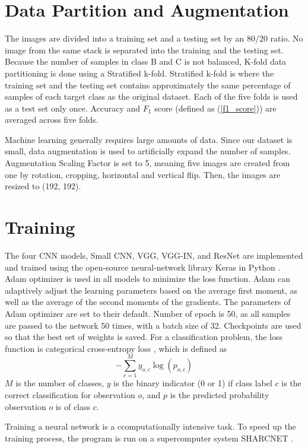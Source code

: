 \section{Data Partition and Augmentation}
\label{result_aug}

The images are divided into a training set and a testing set by an 80/20 ratio. No image from the same stack is separated into the training and the testing set. Because the number of samples in class B and C is not balanced, K-fold data partitioning is done using a Stratified k-fold. Stratified k-fold is where the training set and the testing set contains approximately the same percentage of samples of each target class as the original dataset. Each of the five folds is used as a test set only once. Accuracy and $F_1$ score (defined as (\ref{f1_score})) are averaged across five folds.

Machine learning generally requires large amounts of data. Since our dataset is small, data augmentation is used to artificially expand the number of samples. Augmentation Scaling Factor is set to 5, meaning five images are created from one by rotation, cropping, horizontal and vertical flip. Then, the images are resized to (192, 192).

\section{Training}
\label{result_training}

The four CNN models, Small CNN, VGG, VGG-IN, and ResNet are implemented and trained using the open-source neural-network library Keras \citep{chollet2015keras} in Python \citep{van1995python}. Adam \citep{adam} optimizer is used in all models to minimize the loss function. Adam can adaptively adjust the learning parameters based on the average first moment, as well as the average of the second moments of the gradients. The parameters of Adam optimizer are set to their default. Number of epoch is 50, as all samples are passed to the network 50 times, with a batch size of 32. Checkpoints are used so that the best set of weights is saved. For a classification problem, the loss function is categorical cross-entropy loss \citep{Goodfellow-et-al-2016}, which is defined as $$-\sum^M_{c=1} y_{o,c}\log(p_{o,c})$$
$M$ is the number of classes, $y$ is the binary indicator (0 or 1) if class label $c$ is the correct classification for observation $o$, and $p$ is the predicted probability observation $o$ is of class $c$. 

Training a neural network is a ccomputationally intensive task. To speed up the training process, the program is run on a supercomputer system SHARCNET \citep{sharcnet}.

